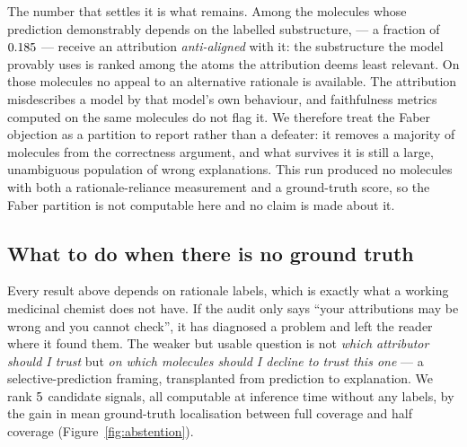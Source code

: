 The number that settles it is what remains. Among the \nFaberUses{} molecules
whose prediction demonstrably depends on the labelled substructure,
\nFaberAntiDespiteUse{} --- a fraction of $0.185{}$ ---
receive an attribution \emph{anti-aligned} with it: the substructure the model
provably uses is ranked among the atoms the attribution deems least relevant.
On those molecules no appeal to an alternative rationale is available. The
attribution misdescribes a model by that model's own behaviour, and
faithfulness metrics computed on the same molecules do not flag it. We
therefore treat the Faber objection as a partition to report rather than a
defeater: it removes a majority of molecules from the correctness argument, and
what survives it is still a large, unambiguous population of wrong
explanations.
\else
This run produced no molecules with both a rationale-reliance measurement and a
ground-truth score, so the Faber partition is not computable here and no claim
is made about it.
\fi

\subsection{What to do when there is no ground truth}
\label{sec:abstention}

\ifHasAbstention
Every result above depends on rationale labels, which is exactly what a working
medicinal chemist does not have. If the audit only says ``your attributions may
be wrong and you cannot check'', it has diagnosed a problem and left the reader
where it found them. The weaker but usable question is not \emph{which
attributor should I trust} but \emph{on which molecules should I decline to
trust this one} --- a selective-prediction framing, transplanted from
prediction to explanation. We rank $5{}$ candidate signals, all
computable at inference time without any labels, by the gain in mean
ground-truth localisation between full coverage and half coverage
(Figure~\ref{fig:abstention}).

